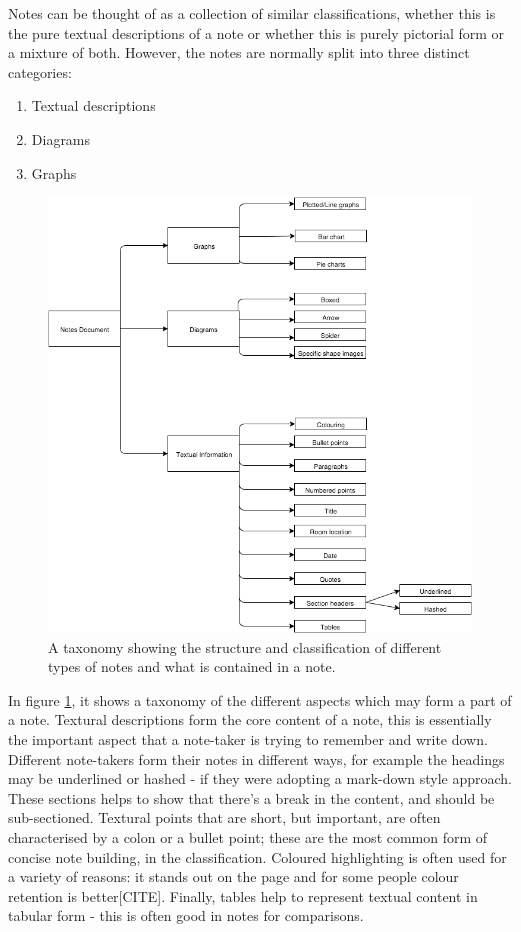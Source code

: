 Notes can be thought of as a collection of similar classifications, whether this is the pure textual descriptions of a note or whether this is purely pictorial form or a mixture of both. However, the notes are normally split into three distinct categories:
\begin{enumerate}
	\item Textual descriptions
	\item Diagrams
	\item Graphs
\end{enumerate}
\begin{figure}[h!]
\includegraphics[scale=0.5]{images/taxonomy}
\centering
\caption{A taxonomy showing the structure and classification of different types of notes and what is contained in a note.}
 \label{fig:taxonomyofnotes}
\end{figure}

In figure \ref{fig:taxonomyofnotes}, it shows a taxonomy of the different aspects which may form a part of a note. Textural descriptions form the core content of a note, this is essentially the important aspect that a note-taker is trying to remember and write down. Different note-takers form their notes in different ways, for example the headings may be underlined or hashed - if they were adopting a mark-down style approach. These sections helps to show that there's a break in the content, and should be sub-sectioned. Textural points that are short, but important, are often characterised by a colon or a bullet point; these are the most common form of concise note building, in the classification. Coloured highlighting is often used for a variety of reasons: it stands out on the page and for some people colour retention is better[CITE]. Finally, tables help to represent textual content in tabular form - this is often good in notes for comparisons.

